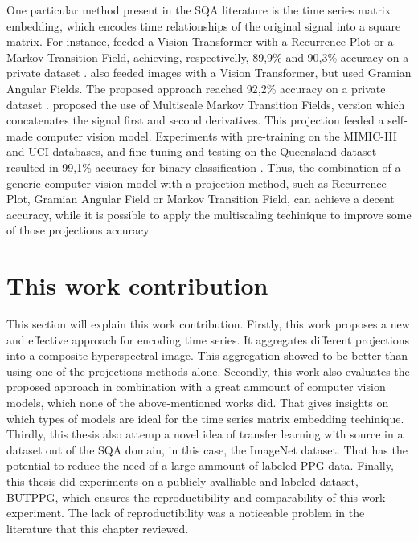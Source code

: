 One particular method present in the \acrshort{SQA} literature is the time series matrix embedding, which encodes time relationships of the original signal into a square matrix. For instance, \citeauthor{review-16} feeded a Vision Transformer with a Recurrence Plot or a Markov Transition Field, achieving, respectivelly, 89,9\% and 90,3\% accuracy on a private dataset \cite{review-16}. \citeauthor{review-17} also feeded images with a Vision Transformer, but used Gramian Angular Fields. The proposed approach reached 92,2\% accuracy on a private dataset \cite{review-17}. \citeauthor{review-18} proposed the use of Multiscale Markov Transition Fields, version which concatenates the signal first and second derivatives. This projection feeded a self-made computer vision model. Experiments with pre-training on the MIMIC-III and UCI databases, and fine-tuning and testing on the Queensland dataset resulted in 99,1\% accuracy for binary classification \cite{review-18}. Thus, the combination of a generic computer vision model with a projection method, such as Recurrence Plot, Gramian Angular Field or Markov Transition Field, can achieve a decent accuracy, while it is possible to apply the multiscaling techinique to improve some of those projections accuracy. 

\section{This work contribution}
\label{sec:my_work}

This section will explain this work contribution. Firstly, this work proposes a new and effective approach for encoding time series. It aggregates different projections into a composite hyperspectral image. This aggregation showed to be better than using one of the projections methods alone. Secondly, this work also evaluates the proposed approach in combination with a great ammount of computer vision models, which none of the above-mentioned works did. That gives insights on which types of models are ideal for the time series matrix embedding techinique. Thirdly, this thesis also attemp a novel idea of transfer learning with source in a dataset out of the \acrshort{SQA} domain, in this case, the ImageNet dataset. That has the potential to reduce the need of a large ammount of labeled \acrshort{PPG} data. Finally, this thesis did experiments on a publicly avalliable and labeled dataset, \acrfull{BUTPPG}, which ensures the reproductibility and comparability of this work experiment. The lack of reproductibility was a noticeable problem in the literature that this chapter reviewed.     
